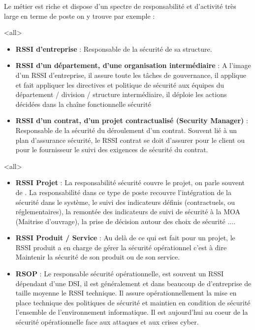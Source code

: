 Le métier est riche et dispose d'un spectre de responsabilité et d'activité très large en terme de poste on y trouve par exemple :

\mode<all>{ 
{
\begin{itemize}
\item \textbf{RSSI d'entreprise} : Responsable de la sécurité de sa structure.
\item  \textbf{RSSI d'un département, d'une organisation intermédiaire} : A l'image d'un RSSI d'entreprise, il assure toute les tâches de gouvernance, il applique et fait appliquer les directives et politique de sécurité aux équipes du département / division / structure intermédiaire, il déploie les actions décidées dans la chaîne fonctionnelle sécurité
\item   \textbf{RSSI d'un contrat, d'un projet contractualisé (Security Manager)} : Responsable de la sécurité du  déroulement d'un contrat. Souvent lié à un plan d'assurance sécurité, le RSSI contrat se doit d'assurer pour le client ou pour le fournisseur le suivi des exigences de sécurité du contrat.
\end{itemize}
}} %


\mode<all>{
{\begin{itemize}
	\item \textbf{RSSI Projet} : La responsabilité sécurité couvre le projet, on parle souvent de . La responsabilité dans ce type de poste recouvre l'intégration de la sécurité dans le système, le suivi des indicateurs définis (contractuels, ou réglementaires), la remontée des indicateurs de suivi de sécurité à la MOA (Maitrise d'ouvrage), la prise de décision autour des choix de sécurité ....
	\item \textbf{RSSI Produit / Service} : Au delà de ce qui est fait pour un projet, le RSSI produit a en charge de gérer la sécurité opérationnel c'est à dire Maintenir la sécurité de son produit ou de son service.
 \item \textbf{RSOP} : Le responsable sécurité opérationnelle, est souvent un RSSI dépendant d'une DSI, il est généralement et dans beaucoup de d'entreprise de taille moyenne le RSSI technique. Il assure opérationnellement la mise en place technique des politiques de sécurité et maintien en condition de sécurité l'ensemble de l'environnement informatique. Il est aujourd'hui au coeur de la sécurité opérationnelle face aux attaques et aux crises cyber.
\end{itemize}
}} %


